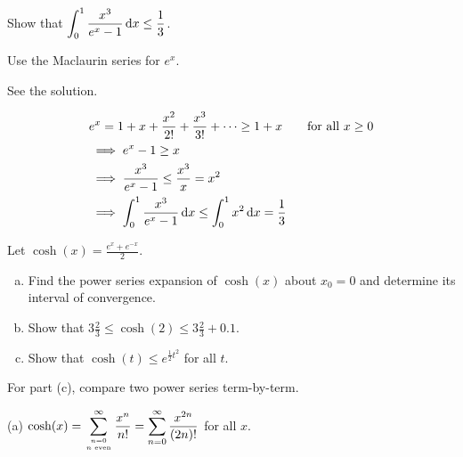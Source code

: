 \begin{question}[1998A]
 Show that $\displaystyle \int_0^1\frac{x^3}{e^x-1}\,\mathrm{d}x\le\frac{1}{3}$.
\end{question}

\begin{hint}
Use the Maclaurin series for $e^x$.
\end{hint}

\begin{answer}
See the solution.
\end{answer}

\begin{solution}
\begin{align*}
&e^x=1+x+\frac{x^2}{2!}+\frac{x^3}{3!}+\cdots
\ge 1+x\qquad\hbox{for all $x\ge 0$}\\
&\implies   e^x-1\ge x \\
&\implies   \frac{x^3}{e^x-1}\le \frac{x^3}{x} = x^2 \\
&\implies   \int_0^1\frac{x^3}{e^x-1}\,\mathrm{d}x \le \int_0^1 x^2\,\mathrm{d}x=\frac{1}{3}
\end{align*}


\end{solution}



\begin{question}[M121 2012A]
Let $\displaystyle \cosh(x) =\frac{e^x+e^{-x}}{2}$.
\begin{enumerate}[(a)]
\item
Find the power series expansion of $\cosh(x)$ about $x_0 = 0$ and
determine its interval of convergence.
\item
Show that $3\frac{2}{3}\le \cosh(2) \le 3\frac{2}{3} + 0.1$.
\item
Show that $\cosh(t) \le e^{\frac{1}{2}t^2}$ for all $t$.
\end{enumerate}
\end{question}

\begin{hint}
For part (c), compare two power series term-by-term.
\end{hint}

\begin{answer}
(a)
$\cosh(x)=\displaystyle \sum\limits_{\genfrac{}{}{0pt}{}{n=0}{n\text{ even}}}^\infty
                                      \frac{x^n}{n!}
         = \sum\limits_{n=0}^\infty\frac{x^{2n}}{(2n)!}$ for all $x$.
\end{answer}

